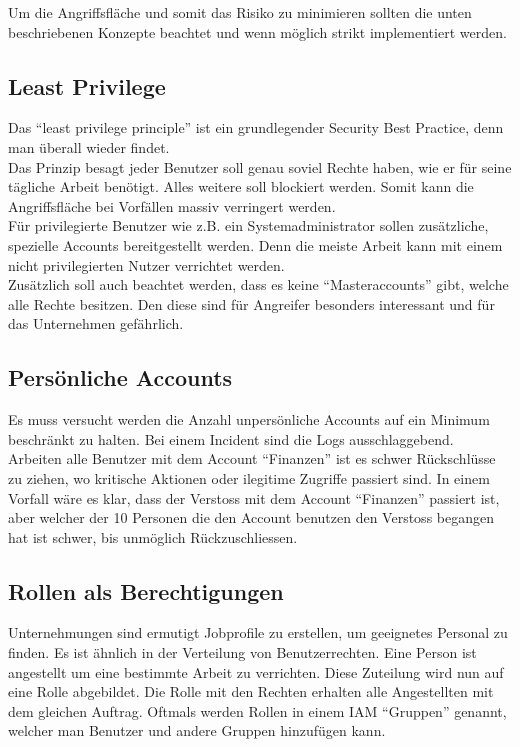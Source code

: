 Um die Angriffsfläche und somit das Risiko zu minimieren sollten die unten beschriebenen Konzepte beachtet und wenn möglich strikt implementiert werden.

\subsection{Least Privilege}
Das ``least privilege principle'' ist ein grundlegender Security Best Practice, denn man überall wieder findet.\\

Das Prinzip besagt jeder Benutzer soll genau soviel Rechte haben, wie er für seine tägliche Arbeit benötigt. Alles weitere soll blockiert werden.
Somit kann die Angriffsfläche bei Vorfällen massiv verringert werden.\\

Für privilegierte Benutzer wie z.B. ein Systemadministrator sollen zusätzliche, spezielle Accounts bereitgestellt werden.
Denn die meiste Arbeit kann mit einem nicht privilegierten Nutzer verrichtet werden.\\

Zusätzlich soll auch beachtet werden, dass es keine ``Masteraccounts'' gibt, welche alle Rechte besitzen.
Den diese sind für Angreifer besonders interessant und für das Unternehmen gefährlich.


\subsection{Persönliche Accounts}
Es muss versucht werden die Anzahl unpersönliche Accounts auf ein Minimum beschränkt zu halten.
Bei einem Incident sind die Logs ausschlaggebend.\\

Arbeiten alle Benutzer mit dem Account ``Finanzen'' ist es schwer Rückschlüsse zu ziehen, wo kritische Aktionen oder ilegitime Zugriffe passiert sind.
In einem Vorfall wäre es klar, dass der Verstoss mit dem Account ``Finanzen'' passiert ist, aber welcher der 10 Personen die den Account benutzen den Verstoss begangen hat ist schwer, bis unmöglich Rückzuschliessen.

\subsection{Rollen als Berechtigungen}
Unternehmungen sind ermutigt Jobprofile zu erstellen, um geeignetes Personal zu finden.
Es ist ähnlich in der Verteilung von Benutzerrechten.
Eine Person ist angestellt um eine bestimmte Arbeit zu verrichten.
Diese Zuteilung wird nun auf eine Rolle abgebildet.
Die Rolle mit den Rechten erhalten alle Angestellten mit dem gleichen Auftrag.
Oftmals werden Rollen in einem IAM ``Gruppen'' genannt, welcher man Benutzer und andere Gruppen hinzufügen kann.\\

